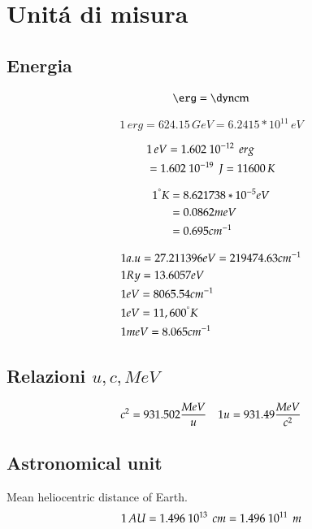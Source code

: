 \documentclass[main.tex]{subfiles}
\begin{document}
\section{Unit\'a di misura}

\subsection{Energia}

\begin{align*}
\si{\erg=\dyn\cm}
\end{align*}

\begin{equation*}
1\,erg = 624.15\,GeV = 6.2415*10^{11}\, eV
\end{equation*}

\begin{align*}
&1\,eV=1.602\ 10^{-12}\ \,erg\\
&=1.602\ 10^{-19}\ \,J=11600\,K\\
\end{align*}

\begin{align*}
1  ^{\degree}K&= 8.621738*10^{-5}  eV \\
&= 0.0862 meV \\
&= 0.695 cm^{-1}
\end{align*}

\begin{align*}
&1 a.u=27.211396 eV=219474.63 cm^{-1}\\
&1 Ry=13.6057 eV \\
&1 eV =8065.54 cm^{-1} \\
&1 eV= 11,600  ^{\degree}K\\
&1 meV = 8.065 cm^{-1}
\end{align*}

\subsection{Relazioni $u,c,MeV$}
 
\begin{align*}
&c^2=931.502\frac{MeV}{u}
&1 u=931.49 \frac{MeV}{c^2}
\end{align*}
 

\subsection{Astronomical unit}

Mean heliocentric distance of Earth.
\begin{equation*}
1\,AU=1.496\ 10^{13}\ \,cm=1.496\ 10^{11}\ \,m
\end{equation*}
\end{document}
